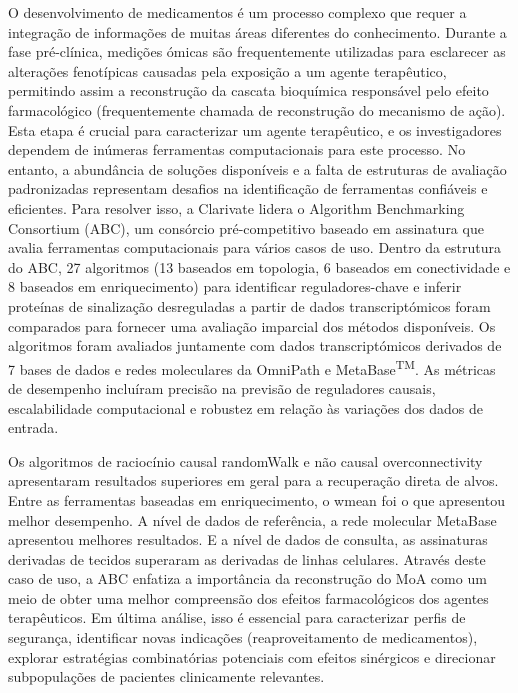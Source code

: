 ﻿%

%

O desenvolvimento de medicamentos é um processo complexo que requer a integração de informações de muitas áreas diferentes do conhecimento.
Durante a fase pré-clínica, medições ómicas são frequentemente utilizadas para esclarecer as alterações fenotípicas causadas pela exposição a um agente terapêutico, permitindo assim a reconstrução da cascata bioquímica responsável pelo efeito farmacológico (frequentemente chamada de reconstrução do mecanismo de ação).
Esta etapa é crucial para caracterizar um agente terapêutico, e os investigadores dependem de inúmeras ferramentas computacionais para este processo.
No entanto, a abundância de soluções disponíveis e a falta de estruturas de avaliação padronizadas representam desafios na identificação de ferramentas confiáveis e eficientes.
Para resolver isso, a Clarivate lidera o Algorithm Benchmarking Consortium (ABC), um consórcio pré-competitivo baseado em assinatura que avalia ferramentas computacionais para vários casos de uso.
Dentro da estrutura do ABC, 27 algoritmos (13 baseados em topologia, 6 baseados em conectividade e 8 baseados em enriquecimento) para identificar reguladores-chave e inferir proteínas de sinalização desreguladas a partir de dados transcriptómicos foram comparados para fornecer uma avaliação imparcial dos métodos disponíveis.
Os algoritmos foram avaliados juntamente com dados transcriptómicos derivados de 7 bases de dados e redes moleculares da OmniPath e MetaBase\textsuperscript{TM}.
As métricas de desempenho incluíram precisão na previsão de reguladores causais, escalabilidade computacional e robustez em relação às variações dos dados de entrada.

Os algoritmos de raciocínio causal randomWalk e não causal overconnectivity apresentaram resultados superiores em geral para a recuperação direta de alvos.
Entre as ferramentas baseadas em enriquecimento, o wmean foi o que apresentou melhor desempenho.
A nível de dados de referência, a rede molecular MetaBase apresentou melhores resultados. E a nível de dados de consulta, as assinaturas derivadas de tecidos superaram as derivadas de linhas celulares.
Através deste caso de uso, a ABC enfatiza a importância da reconstrução do MoA como um meio de obter uma melhor compreensão dos efeitos farmacológicos dos agentes terapêuticos.
Em última análise, isso é essencial para caracterizar perfis de segurança, identificar novas indicações (reaproveitamento de medicamentos), explorar estratégias combinatórias potenciais com efeitos sinérgicos e direcionar subpopulações de pacientes clinicamente relevantes.


